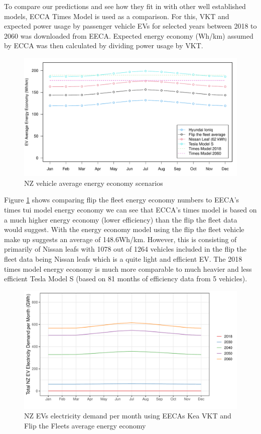 \documentclass[
]{article}
\begin{document}
To compare our predictions and see how they fit in with other well
established models, ECCA Times Model \cite{times_model} is used as a
comparison. For this, VKT and expected power usage by passenger vehicle
EVs for selected years between 2018 to 2060 was downloaded from EECA.
Expected energy economy (Wh/km) assumed by ECCA was then calculated by
dividing power usage by VKT.

\begin{figure}
\centering
\includegraphics{final_report_files/figure-latex/vehicle_consum-1.pdf}
\caption{NZ vehicle average energy economy
scenarios\label{fig:vehicle_consum}}
\end{figure}

Figure \ref{fig:vehicle_consum} shows comparing flip the fleet energy
economy numbers to EECA's times tui model \cite{times_model} energy
economy we can see that ECCA's times model is based on a much higher
energy economy (lower efficiency) than the flip the fleet data would
suggest. With the energy economy model using the flip the fleet vehicle
make up suggests an average of 148.6Wh/km. However, this is consisting
of primarily of Nissan leafs with 1078 out of 1264 vehicles included in
the flip the fleet data being Nissan leafs which is a quite light and
efficient EV. The 2018 times model energy economy is much more
comparable to much heavier and less efficient Tesla Model S (based on 81
months of efficiency data from 5 vehicles).

\begin{figure}
\centering
\includegraphics{final_report_files/figure-latex/kea_power_usage-1.pdf}
\caption{NZ EVs electricity demand per month using EECAs Kea VKT and
Flip the Fleets average energy economy\label{fig:kea_power_usage}}
\end{figure}
\end{document}
